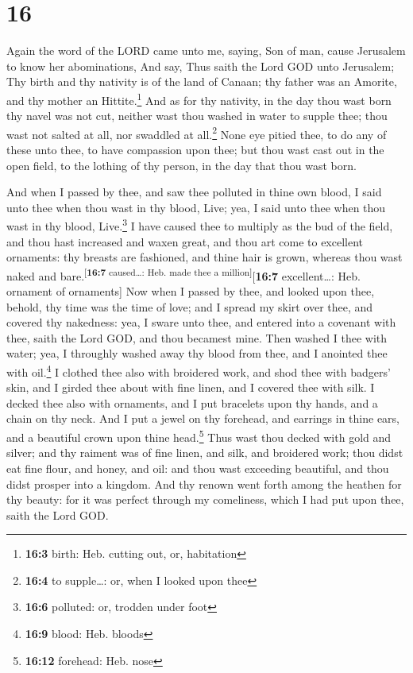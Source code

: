 \hypertarget{section-15}{%
\section{16}\label{section-15}}

 Again the word of the LORD came unto me, saying,
 Son of man, cause Jerusalem to know her abominations,
 And say, Thus saith the Lord GOD unto Jerusalem; Thy
birth and thy nativity is of the land of Canaan; thy father was an
Amorite, and thy mother an Hittite.\footnote{\textbf{16:3} birth: Heb.
  cutting out, or, habitation}  And as for thy nativity,
in the day thou wast born thy navel was not cut, neither wast thou
washed in water to supple thee; thou wast not salted at all, nor
swaddled at all.\footnote{\textbf{16:4} to supple\ldots: or, when I
  looked upon thee}  None eye pitied thee, to do any of
these unto thee, to have compassion upon thee; but thou wast cast out in
the open field, to the lothing of thy person, in the day that thou wast
born.

 And when I passed by thee, and saw thee polluted in thine
own blood, I said unto thee when thou wast in thy blood, Live; yea, I
said unto thee when thou wast in thy blood, Live.\footnote{\textbf{16:6}
  polluted: or, trodden under foot}  I have caused thee to
multiply as the bud of the field, and thou hast increased and waxen
great, and thou art come to excellent ornaments: thy breasts are
fashioned, and thine hair is grown, whereas thou wast naked and
bare.\textsuperscript{{[}\textbf{16:7} caused\ldots: Heb. made thee a
million{]}}{[}\textbf{16:7} excellent\ldots: Heb. ornament of
ornaments{]}  Now when I passed by thee, and looked upon
thee, behold, thy time was the time of love; and I spread my skirt over
thee, and covered thy nakedness: yea, I sware unto thee, and entered
into a covenant with thee, saith the Lord GOD, and thou becamest mine.
 Then washed I thee with water; yea, I throughly washed
away thy blood from thee, and I anointed thee with oil.\footnote{\textbf{16:9}
  blood: Heb. bloods}  I clothed thee also with broidered
work, and shod thee with badgers' skin, and I girded thee about with
fine linen, and I covered thee with silk.  I decked thee
also with ornaments, and I put bracelets upon thy hands, and a chain on
thy neck.  And I put a jewel on thy forehead, and
earrings in thine ears, and a beautiful crown upon thine
head.\footnote{\textbf{16:12} forehead: Heb. nose}  Thus
wast thou decked with gold and silver; and thy raiment was of fine
linen, and silk, and broidered work; thou didst eat fine flour, and
honey, and oil: and thou wast exceeding beautiful, and thou didst
prosper into a kingdom.  And thy renown went forth among
the heathen for thy beauty: for it was perfect through my comeliness,
which I had put upon thee, saith the Lord GOD.

